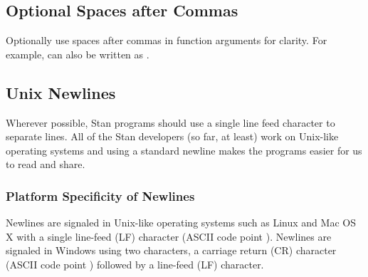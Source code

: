 \subsection{Optional Spaces after Commas}

Optionally use spaces after commas in function arguments for clarity.
For example,  can also be
written as .



\subsection{Unix Newlines}

Wherever possible, Stan programs should use a single line feed 
character to separate lines.  All of the Stan developers (so far, at 
least) work on Unix-like operating systems and using a standard 
newline makes the programs easier for us to read and share.  

\subsubsection{Platform Specificity of Newlines}

Newlines are signaled in Unix-like operating systems such as Linux and
Mac OS X with a single line-feed (LF) character (ASCII code point
).  Newlines are signaled in Windows using two characters,
a carriage return (CR) character (ASCII code point )
followed by a line-feed (LF) character.


